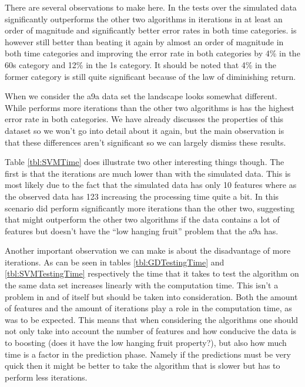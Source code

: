 \par There are several observations to make here. In the tests over the simulated data \NHB significantly outperforms the other two algorithms in iterations in at least an order of magnitude and significantly better error rates in both time categories. \squintB is however still better than \adaB beating it again by almost an order of magnitude in both time categories and improving the error rate in both categories by 4\% in the 60s category and 12\% in the 1s category. It should be noted that 4\% in the former category is still quite significant because of the law of diminishing return. 
\par When we consider the a9a data set the landscape looks somewhat different. While \squintB performs more iterations than the other two algorithms is has the highest error rate in both categories. We have already discusses the properties of this dataset so we won't go into detail about it again, but the main observation is that these differences aren't significant so we can largely dismiss these results. 

\par Table \ref{tbl:SVMTime} does illustrate two other interesting things though. The first is that the iterations are much lower than with the simulated data. This is most likely due to the fact that the simulated data has only 10 features where as the observed data has 123 increasing the processing time quite a bit. In this scenario \squintB did perform significantly more iterations than the other two, suggesting that \squintB might outperform the other two algorithms if the data contains a lot of features but doesn't have the ``low hanging fruit'' problem that the a9a has. 

\par Another important observation we can make is about the disadvantage of more iterations. As can be seen in tables \ref{tbl:GDTestingTime} and \ref{tbl:SVMTestingTime} respectively the time that it takes to test the algorithm on the same data set increases linearly with the computation time. This isn't a problem in and of itself but should be taken into consideration. Both the amount of features and the amount of iterations play a role in the computation time, as was to be expected. This means that when considering the algorithms one should not only take into account the number of features and how conducive the data is to boosting (does it have the low hanging fruit property?), but also how much time is a factor in the prediction phase. Namely if the predictions must be very quick then it might be better to take the algorithm that is slower but has to perform less iterations.  

